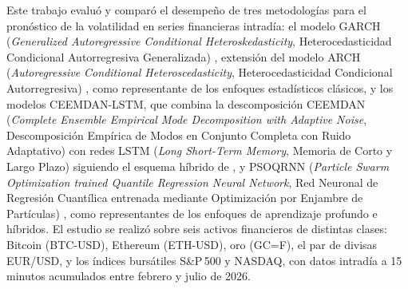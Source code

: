 \documentclass[12pt]{paper}
\begin{document}
Este trabajo evaluó y comparó el desempeño de tres metodologías para el pronóstico de la volatilidad en series financieras intradía: el modelo GARCH (\textit{Generalized Autoregressive Conditional Heteroskedasticity}, Heterocedasticidad Condicional Autorregresiva Generalizada) \cite{bollerslev1986garch}, extensión del modelo ARCH (\textit{Autoregressive Conditional Heteroscedasticity}, Heterocedasticidad Condicional Autorregresiva) \cite{engle1982}, como representante de los enfoques estadísticos clásicos, y los modelos CEEMDAN-LSTM, que combina la descomposición CEEMDAN (\textit{Complete Ensemble Empirical Mode Decomposition with Adaptive Noise}, Descomposición Empírica de Modos en Conjunto Completa con Ruido Adaptativo) \cite{torres2011ceemdan} con redes LSTM (\textit{Long Short-Term Memory}, Memoria de Corto y Largo Plazo) \cite{hochreiter1997lstm} siguiendo el esquema híbrido de \cite{cao2019financial}, y PSOQRNN (\textit{Particle Swarm Optimization trained Quantile Regression Neural Network}, Red Neuronal de Regresión Cuantílica entrenada mediante Optimización por Enjambre de Partículas) \cite{pradeepkumar2017forecasting}, como representantes de los enfoques de aprendizaje profundo e híbridos. El estudio se realizó sobre seis activos financieros de distintas clases: Bitcoin (BTC-USD), Ethereum (ETH-USD), oro (GC=F), el par de divisas EUR/USD, y los índices bursátiles S\&P\,500 y NASDAQ, con datos intradía a 15 minutos acumulados entre febrero y julio de 2026.
\end{document}
